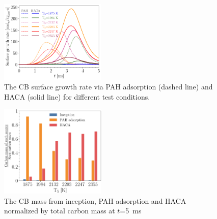 \begin{figure}[H]
	\centering
	\includegraphics[width=0.45\textwidth]{Figures/time_growth.pdf}
	\caption{The CB surface growth rate via PAH adsorption (dashed line) and HACA (solid line) for different test conditions.}
	\label{fig:time_growth} 
\end{figure}

\begin{figure}[H]
	\centering
	\includegraphics[width=0.45\textwidth]{Figures/carbon_cont.pdf}
	\caption{The CB mass from inception, PAH adsorption and HACA normalized by total carbon mass at $t$=5~ms}
	\label{fig:carbon_cont} 
\end{figure}